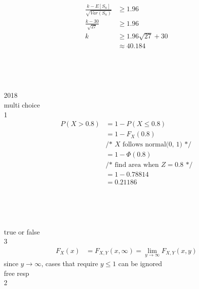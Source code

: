 \documentclass[12pt,border=4pt,multi]{article} %
\begin{document}
\begin{align*}
\frac{k - E[S_n]}{\sqrt{Var(S_n)}} &\geq 1.96\\
\frac{k - 30}{\sqrt{27}} &\geq 1.96\\
k &\geq 1.96\sqrt{27} + 30\\
&\approx 40.184\\
\end{align*}
\\
\\
\\
\\
2018\\
multi choice\\
1\\
\begin{align*}
P(X > 0.8) &= 1 - P(X \leq 0.8)\\
&= 1 - F_{X}(0.8)\\
&\text{/* $X$ follows normal(0, 1) */}\\
&= 1 - \Phi(0.8)\\
&\text{/* find area when $Z = 0.8$ */}\\
&= 1 - 0.78814\\
&= 0.21186\\
\end{align*}
\\
\\
\\
\\
true or false\\
3
\begin{align*}
F_X(x) &= F_{X, Y}(x, \infty) = \lim_{y \rightarrow \infty} F_{X, Y}(x, y)
\end{align*}
since $y \rightarrow \infty$, cases that require $y \leq 1$ can be ignored\\
\newpage
\noindent
free resp\\
2
\end{document}
